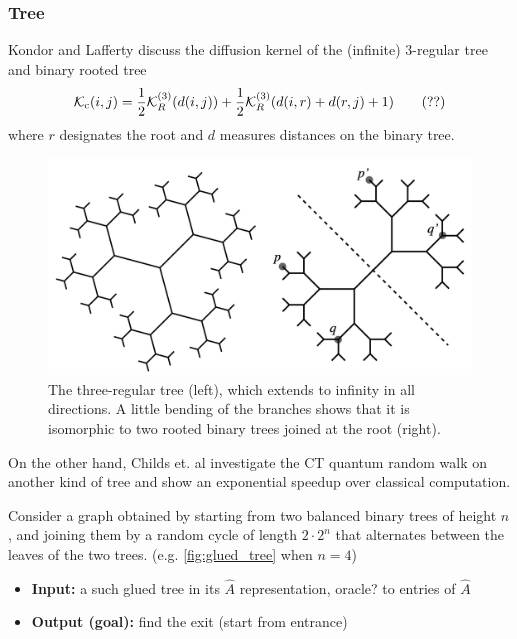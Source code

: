 \subsubsection{Tree}
Kondor and Lafferty \cite{kondorDiffusionKernelsGraphs2002} discuss the diffusion kernel of the (infinite) 3-regular tree and binary rooted tree
\begin{equation}
	\mathcal{K}_{\textup{c}} (i,j) = 
	\frac{1}{2} \mathcal{K}_{R}^{(3)}(d(i,j)) + \frac{1}{2} \mathcal{K}_R^{(3)} \qty(d(i,r)+d(r,j)+1)
	\tag{??}
\end{equation}
where $r$ designates the root and $d$ measures distances on the binary tree.
\begin{figure}[!ht]
	\centering
	\includegraphics[width=.6\linewidth]{regular_tree.png}
	\caption{The three-regular tree (left), which extends to inﬁnity in all directions. A little bending of the branches shows that it is isomorphic to two rooted binary trees joined at the root (right). \cite{kondorDiffusionKernelsGraphs2002}}
\end{figure}
On the other hand, Childs et. al \cite{childsExponentialAlgorithmicSpeedup2003} investigate the CT quantum random walk on another kind of tree and show an exponential speedup over classical computation.
\begin{problem}
	Consider a graph obtained by starting from two balanced binary trees of height $n$, and joining them by a random cycle of length $2\cdot 2^n$ that alternates between the leaves of the two trees. (e.g. \cref{fig:glued_tree} when $n = 4$)
	\begin{itemize}
		\item \textbf{Input:} a such glued tree in its  $\hat{A}$ representation, oracle? to entries of $\hat{A}$
		\item \textbf{Output (goal):} find the exit (start from entrance)
	\end{itemize}
\end{problem}
